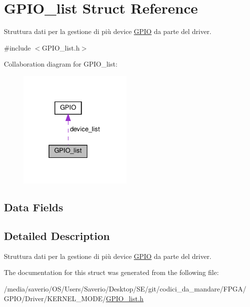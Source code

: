 \hypertarget{structGPIO__list}{}\section{G\+P\+I\+O\+\_\+list Struct Reference}
\label{structGPIO__list}


Struttura dati per la gestione di più device \hyperlink{structGPIO}{G\+P\+IO} da parte del driver.  




{\ttfamily \#include $<$G\+P\+I\+O\+\_\+list.\+h$>$}



Collaboration diagram for G\+P\+I\+O\+\_\+list\+:\nopagebreak
\begin{figure}[H]
\begin{center}
\leavevmode
\includegraphics[width=160pt]{structGPIO__list__coll__graph}
\end{center}
\end{figure}
\subsection*{Data Fields}


\subsection{Detailed Description}
Struttura dati per la gestione di più device \hyperlink{structGPIO}{G\+P\+IO} da parte del driver. 

The documentation for this struct was generated from the following file\+:\begin{DoxyCompactItemize}
\item 
/media/saverio/\+O\+S/\+Users/\+Saverio/\+Desktop/\+S\+E/git/codici\+\_\+da\+\_\+mandare/\+F\+P\+G\+A/\+G\+P\+I\+O/\+Driver/\+K\+E\+R\+N\+E\+L\+\_\+\+M\+O\+D\+E/\hyperlink{GPIO__list_8h}{G\+P\+I\+O\+\_\+list.\+h}\end{DoxyCompactItemize}
